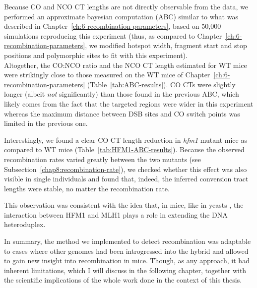Because CO and NCO CT lengths are not directly observable from the data, we performed an approximate bayesian computation (ABC) similar to what was described in Chapter~\ref{ch:6-recombination-parameters}, based on 50,000 simulations reproducing this experiment (thus, as compared to Chapter~\ref{ch:6-recombination-parameters}, we modified hotspot width, fragment start and stop positions and polymorphic sites to fit with this experiment).\\




Altogether, the CO:NCO ratio and the NCO CT length estimated for WT mice were strikingly close to those measured on the WT mice of Chapter~\ref{ch:6-recombination-parameters} (Table~\ref{tab:ABC-results}).
CO CTs were slightly longer (albeit \textit{not} significantly) than those found in the previous ABC, which likely comes from the fact that the targeted regions were wider in this experiment whereas the maximum distance between DSB sites and CO switch points was limited in the previous one.

Interestingly, we found a clear CO CT length reduction in \textit{hfm1} mutant mice as compared to WT mice (Table~\ref{tab:HFM1-ABC-results}).
Because the observed recombination rates varied greatly between the two mutants (see Subsection~\ref{chap8:recombination-rate}), we checked whether this effect was also visible in single individuals and found that, indeed, the inferred conversion tract lengths were stable, no matter the recombination rate.
\begin{mccorrection}
This observation was consistent with the idea that, in mice, like in yeasts \citep{duroc2017concerted}, the interaction between HFM1 and MLH1 plays a role in extending the DNA heteroduplex.\\
\end{mccorrection}


In summary, the method we implemented to detect recombination was adaptable to cases where other genomes had been introgressed into the hybrid and allowed to gain new insight into recombination in mice.
Though, as any approach, it had inherent limitations, which I will discuss in the following chapter, together with the scientific implications of the whole work done in the context of this thesis.



